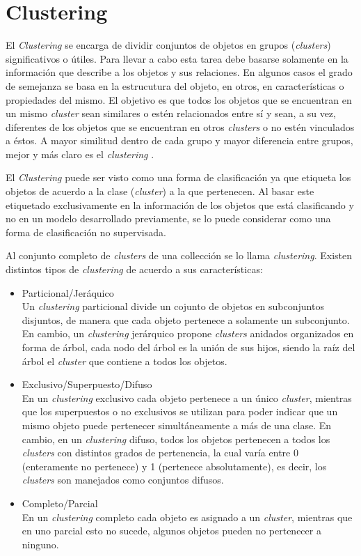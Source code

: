 \section{Clustering}

El \textit{Clustering} se encarga de dividir conjuntos de objetos en grupos (\textit{clusters}) significativos
o útiles. Para llevar a cabo esta tarea debe basarse solamente en la información que describe
a los objetos y sus relaciones. En algunos casos el grado de semejanza se basa en la estrucutura del objeto, en
otros, en características o propiedades del mismo. El objetivo es que todos los objetos que se encuentran en un
mismo \textit{cluster} sean similares o estén relacionados entre sí y sean, a su vez, diferentes de los objetos
que se encuentran en otros \textit{clusters} o no estén vinculados a éstos. A mayor similitud dentro de cada grupo
y mayor diferencia entre grupos, mejor y más claro es el \textit{clustering} \parencite{pang2006introduction}. 

El \textit{Clustering} puede ser visto como una forma de clasificación ya que etiqueta los objetos de acuerdo a la
clase (\textit{cluster}) a la que pertenecen. Al basar este etiquetado exclusivamente en la información de los
objetos que está clasificando y no en un modelo desarrollado previamente, se lo puede considerar como una forma
de clasificación no supervisada.

Al conjunto completo de \textit{clusters} de una collección se lo llama \textit{clustering}. Existen distintos
tipos de \textit{clustering} de acuerdo a sus características:

\begin{itemize}
 \item Particional/Jeráquico \\
 Un \textit{clustering} particional divide un cojunto de objetos en subconjuntos disjuntos, de manera que cada
 objeto pertenece a solamente un subconjunto. En cambio, un \textit{clustering} jerárquico propone \textit{clusters}
 anidados organizados en forma de árbol, cada nodo del árbol es la unión de sus hijos, siendo la raíz del árbol
 el \textit{cluster} que contiene a todos los objetos.
 \item Exclusivo/Superpuesto/Difuso \\
 En un \textit{clustering} exclusivo cada objeto pertenece a un único \textit{cluster}, mientras que los
 superpuestos o no exclusivos se utilizan para poder indicar que un mismo objeto puede pertenecer simultáneamente
 a más de una clase. En cambio, en un \textit{clustering} difuso, todos los objetos pertenecen a todos los \textit{clusters}
 con distintos grados de pertenencia, la cual varía entre 0 (enteramente no pertenece) y 1 (pertenece absolutamente),
 es decir, los \textit{clusters} son manejados como conjuntos difusos.
 \item Completo/Parcial \\
 En un \textit{clustering} completo cada objeto es asignado a un \textit{cluster}, mientras que en uno parcial
 esto no sucede, algunos objetos pueden no pertenecer a ninguno.
\end{itemize}

